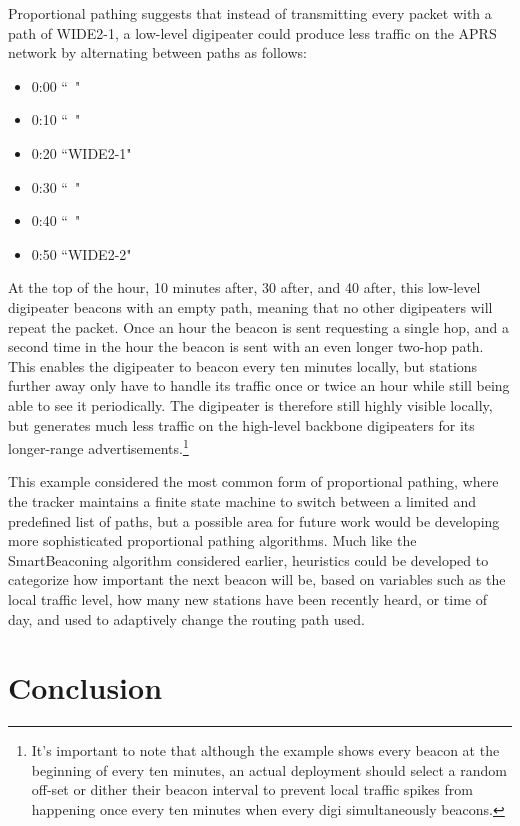 Proportional pathing suggests that instead of transmitting every packet with
a path of WIDE2-1, a low-level digipeater could produce less traffic on the
APRS network by alternating between paths as follows:
\begin{itemize}
	\item 0:00 ``~"
	\item 0:10 ``~"
	\item 0:20 ``WIDE2-1"
	\item 0:30 ``~"
	\item 0:40 ``~"
	\item 0:50 ``WIDE2-2"
\end{itemize}

At the top of the hour, 10 minutes after, 30 after, and 40 after, 
this low-level digipeater
beacons with an empty path, meaning that no other digipeaters will repeat the
packet.
Once an hour the beacon is sent requesting a single hop, and a second time
in the hour the beacon is sent with an even longer two-hop path.
This enables the digipeater to beacon every ten minutes locally,
but stations further away only have to handle its traffic once or twice an hour
while still being able to see it periodically.
The digipeater is therefore still highly visible locally, but generates
much less traffic on the high-level backbone digipeaters for its
longer-range advertisements.\footnote{It's important
	to note that although the example shows every beacon at the beginning of
	every ten minutes, an actual deployment should select a random off-set
or dither their beacon interval to prevent local traffic spikes 
from happening once every ten minutes when every digi simultaneously beacons.}

This example considered the most common form of proportional pathing,
where the tracker maintains a finite state machine to switch between
a limited and predefined list of paths,
but a possible area for future work would be developing more sophisticated
proportional pathing algorithms.
Much like the SmartBeaconing algorithm considered earlier,
heuristics could be developed to categorize how important the next beacon
will be, based on variables such as the local traffic level,
how many new stations have been recently heard, or time of day,
and used to adaptively change the routing path used.

\section{Conclusion}

